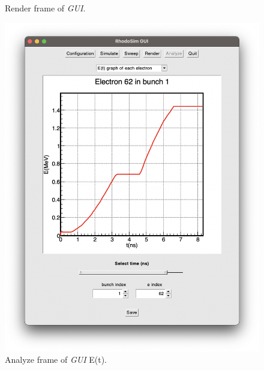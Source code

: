 \documentclass[a4paper,oneside,12pt]{report}
\numberwithin{equation}{chapter}
\begin{document}
{\begin{figure}[H]
    \vspace{-20pt}
    \caption{Render frame of \textit{GUI}.}
    \label{fig:gui_render_2}
\end{figure}

\vspace{-30pt}
\begin{figure}[H]
    \centering
    \includegraphics[width=\linewidth]{./figures/rhodoSim/GUI_analyze_Et_2.png}
        
    \vspace{-20pt}
    \caption{Analyze frame of \textit{GUI} E(t).}
    \label{fig:gui_analyze_Et2}
\end{figure}

}
\end{document}
